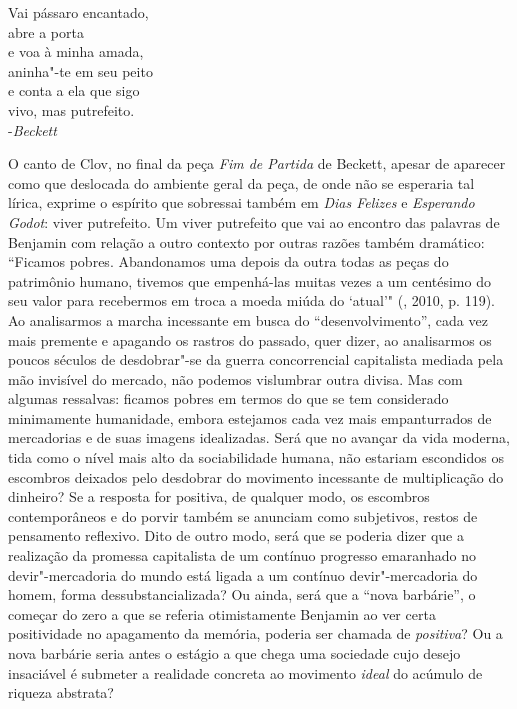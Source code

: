 \begin{flushright}
\scriptsize{Vai pássaro encantado,\\
abre a porta\\
e voa à minha amada,\\
aninha"-te em seu peito\\
e conta a ela que sigo\\
vivo, mas putrefeito.\\
-\emph{Beckett}}
\end{flushright}

O canto de Clov, no final da peça \emph{Fim de Partida} de Beckett,
apesar de aparecer como que deslocada do ambiente geral da
peça, de onde não se esperaria tal lírica, exprime o espírito que
sobressai também em \emph{Dias Felizes} e \emph{Esperando Godot}:
viver putrefeito. Um viver putrefeito que vai ao encontro das
palavras de Benjamin com relação a outro contexto por outras razões
também dramático: ``Ficamos pobres. Abandonamos uma depois da outra
todas as peças do patrimônio humano, tivemos que empenhá-las muitas
vezes a um centésimo do seu valor para recebermos em troca a moeda miúda
do `atual'" (, 2010, p. 119). Ao analisarmos a marcha
incessante em busca do ``desenvolvimento'', cada vez mais premente e
apagando os rastros do passado, quer dizer, ao analisarmos os poucos
séculos de desdobrar"-se da guerra concorrencial capitalista mediada pela
mão invisível do mercado, não podemos vislumbrar outra divisa. Mas com
algumas ressalvas: ficamos pobres em termos do que se tem considerado
minimamente humanidade, embora estejamos cada vez mais empanturrados de
mercadorias e de suas imagens idealizadas. Será que no avançar da vida
moderna, tida como o nível mais alto da sociabilidade humana, não
estariam escondidos os escombros deixados pelo desdobrar do movimento
incessante de multiplicação do dinheiro? Se a resposta for positiva, de
qualquer modo, os escombros contemporâneos e do porvir também se
anunciam como subjetivos, restos de pensamento reflexivo. Dito de outro
modo, será que se poderia dizer que a realização da promessa capitalista
de um contínuo progresso emaranhado no devir"-mercadoria do mundo está
ligada a um contínuo devir"-mercadoria do homem, forma
dessubstancializada? Ou ainda, será que a ``nova barbárie'', o começar
do zero a que se referia otimistamente Benjamin ao ver
certa positividade no apagamento da memória, poderia ser chamada de
\emph{positiva}? Ou a nova barbárie seria antes o estágio a que chega
uma sociedade cujo desejo insaciável é submeter a realidade concreta ao
movimento \emph{ideal} do acúmulo de riqueza abstrata?

